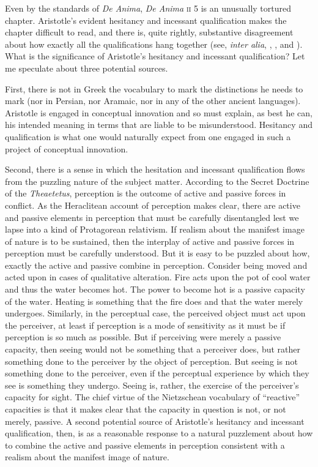 Even by the standards of \emph{De Anima}, \emph{De Anima} \textsc{ii} 5 is an unusually tortured chapter. Aristotle's evident hesitancy and incessant qualification makes the chapter difficult to read, and there is, quite rightly, substantive disagreement about how exactly all the qualifications hang together (see, \emph{inter alia}, \citealt{Burnyeat:2002an}, \citealt{Heinaman:2007ys}, and \citealt{Bowin:2011uq}). What is the significance of Aristotle's hesitancy and incessant qualification? Let me speculate about three potential sources. 

First, there is not in Greek the vocabulary to mark the distinctions he needs to mark (nor in Persian, nor Aramaic, nor in any of the other ancient languages). Aristotle is engaged in conceptual innovation and so must explain, as best he can, his intended meaning in terms that are liable to be misunderstood. Hesitancy and qualification is what one would naturally expect from one engaged in such a project of conceptual innovation. 

Second, there is a sense in which the hesitation and incessant qualification flows from the puzzling nature of the subject matter. According to the Secret Doctrine of the \emph{Theaetetus}, perception is the outcome of active and passive forces in conflict. As the Heraclitean account of perception makes clear, there are active and passive elements in perception that must be carefully disentangled lest we lapse into a kind of Protagorean relativism. If realism about the manifest image of nature is to be sustained, then the interplay of active and passive forces in perception must be carefully understood. But it is easy to be puzzled about how, exactly the active and passive combine in perception. Consider being moved and acted upon in cases of qualitative alteration. Fire acts upon the pot of cool water and thus the water becomes hot. The power to become hot is a passive capacity of the water. Heating is something that the fire does and that the water merely undergoes. Similarly, in the perceptual case, the perceived object must act upon the perceiver, at least if perception is a mode of sensitivity as it must be if perception is so much as possible. But if perceiving were merely a passive capacity, then seeing would not be something that a perceiver does, but rather something done to the perceiver by the object of perception. But seeing is not something done to the perceiver, even if the perceptual experience by which they see is something they undergo. Seeing is, rather, the exercise of the perceiver's capacity for sight. The chief virtue of the Nietzschean vocabulary of ``reactive'' capacities is that it makes clear that the capacity in question is not, or not merely, passive. A second potential source of Aristotle's hesitancy and incessant qualification, then, is as a reasonable response to a natural puzzlement about how to combine the active and passive elements in perception consistent with a realism about the manifest image of nature.

